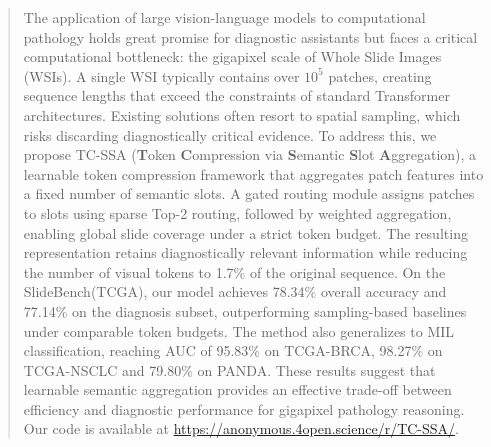 \documentclass[runningheads]{llncs}
\begin{document}
\begin{abstract}
The application of large vision-language models to computational pathology holds great promise for diagnostic assistants but faces a critical computational bottleneck: the gigapixel scale of Whole Slide Images (WSIs). A single WSI typically contains over $10^5$ patches, creating sequence lengths that exceed the constraints of standard Transformer architectures. Existing solutions often resort to spatial sampling, which risks discarding diagnostically critical evidence. 
To address this, we propose TC-SSA (\textbf{T}oken \textbf{C}ompression via \textbf{S}emantic \textbf{S}lot \textbf{A}ggregation), a learnable token compression framework that aggregates patch features into a fixed number of semantic slots.
A gated routing module assigns patches to slots using sparse Top-2 routing, followed by weighted aggregation, enabling global slide coverage under a strict token budget. The resulting representation retains diagnostically relevant information while reducing the number of visual tokens to 1.7\% of the original sequence.
On the SlideBench(TCGA), our model achieves 78.34\% overall accuracy and 77.14\% on the diagnosis subset, outperforming sampling-based baselines under comparable token budgets. The method also generalizes to MIL classification, reaching AUC of 95.83\% on TCGA-BRCA, 98.27\% on TCGA-NSCLC and 79.80\% on PANDA. These results suggest that learnable semantic aggregation provides an effective trade-off between efficiency and diagnostic performance for gigapixel pathology reasoning.
Our code is available at \url{https://anonymous.4open.science/r/TC-SSA/}.


\end{abstract}
%
%
%
\end{document}
